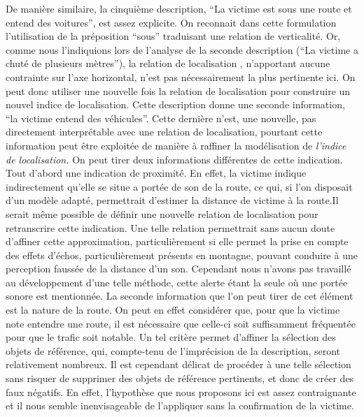 De manière similaire, la cinquième description, \enquote{La victime
  est sous une route et entend des voitures}, est assez explicite. On
reconnait dans cette formulation l'utilisation de la préposition
\enquote{sous} traduisant une relation de verticalité. Or, comme nous
l'indiquions lors de l'analyse de la seconde description (\enquote{La
  victime a chuté de plusieurs mètres}), la relation de localisation
, n'apportant aucune contrainte sur l'axe
horizontal, n'est pas nécessairement la plus pertinente ici. On peut
donc utiliser une nouvelle fois la relation de localisation
 pour construire un nouvel indice de
localisation. Cette description donne une seconde information,
\enquote{la victime entend des véhicules}. Cette dernière n'est, une
nouvelle, pas directement interprétable avec une relation de
localisation, pourtant cette information peut être exploitée de
manière à raffiner la modélisation de \emph{l'indice de localisation.}
On peut tirer deux informations différentes de cette indication. Tout
d'abord une indication de proximité. En effet, la victime indique
indirectement qu'elle se situe a portée de son de la route, ce qui, si
l'on disposait d'un modèle adapté, permettrait d'estimer la distance
de victime à la route.Il serait même possible de définir une nouvelle
relation de localisation  pour retranscrire
cette indication. Une telle relation permettrait sans aucun doute
d'affiner cette approximation, particulièrement si elle permet la
prise en compte des effets d’échos, particulièrement présents en
montagne, pouvant conduire à une perception faussée de la distance
d'un son. Cependant nous n'avons pas travaillé au développement d'une
telle méthode, cette alerte étant la seule où une portée sonore est
mentionnée. La seconde information que l'on peut tirer de cet élément
est la nature de la route. On peut en effet considérer que, pour que
la victime note entendre une route, il est nécessaire que celle-ci
soit suffisamment fréquentée pour que le trafic soit notable. Un tel
critère permet d'affiner la sélection des objets de référence, qui,
compte-tenu de l’imprécision de la description, seront relativement
nombreux. Il est cependant délicat de procéder à une telle sélection
sans risquer de supprimer des objets de référence pertinents, et donc
de créer des faux négatifs. En effet, l'hypothèse que nous proposons
ici est assez contraignante et il nous semble inenvisageable de
l'appliquer sans la confirmation de la victime.

